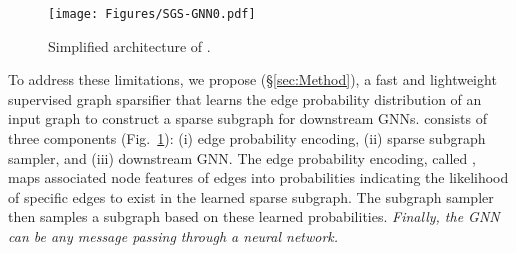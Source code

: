\begin{figure}[t]
\centering
\texttt{[image: Figures/SGS-GNN0.pdf]}
\caption{Simplified architecture of 
\sgs.}
\label{fig:simplesgsgnn}
\end{figure}

To address these limitations, we propose \sgs (\S\ref{sec:Method}), a fast and lightweight supervised graph sparsifier that learns the edge probability distribution of an input graph to construct a sparse subgraph for downstream GNNs. \sgs consists of three components (Fig.~\ref{fig:simplesgsgnn}): (i) edge probability encoding, (ii) sparse subgraph sampler, and (iii) downstream GNN. The edge probability encoding, called \edgemlp, maps associated node features of edges into probabilities indicating the likelihood of specific edges to exist in the learned sparse subgraph. The subgraph sampler then samples a subgraph based on these learned probabilities. \emph{Finally, the GNN can be any message passing through a neural network.} 
